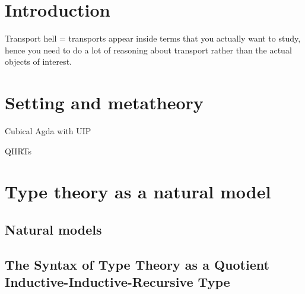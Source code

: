 \documentclass[sigplan,10pt,anonymous,review]{acmart}\settopmatter{printfolios=true,printccs=false,printacmref=false}
\begin{document}



\maketitle


\section{Introduction}

Transport hell = transports appear inside terms that you actually want to study, hence you need to do a lot of reasoning about transport rather than the actual objects of interest.


\section{Setting and metatheory}

Cubical Agda with UIP

QIIRTs

\section{Type theory as a natural model}

\subsection{Natural models}

\subsection{The Syntax of Type Theory as a Quotient Inductive-Inductive-Recursive Type}
\end{document}
